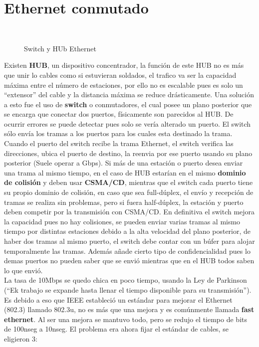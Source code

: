 \documentclass[
	12pt, %
	fleqn, %
	a4paper, %
	oneside, %
]{LegrandOrangeBook}
\begin{document}
\section{Ethernet conmutado}
\begin{figure}[]
\centering
{}\\
\caption{Switch y HUb Ethernet}
\end{figure}
Existen \textbf{HUB}, un dispositivo concentrador, la función de este HUB no es más que unir lo cables como si estuvieran soldados, el trafico va ser la capacidad máxima entre el número de estaciones, por ello no es escalable pues es solo un ``extensor'' del cable y la distancia máxima se reduce drásticamente. Una solución a esto fue el uso de \textbf{switch} o conmutadores, el cual posee un plano posterior que se encarga que conectar dos puertos, físicamente son parecidos al HUB. De ocurrir errores se puede detectar pues solo se vería alterado un puerto. El switch sólo envía los tramas a los puertos para los cuales esta destinado la trama. Cuando el puerto del switch recibe la trama Ethernet, el switch verifica las direcciones, ubica el puerto de destino, la reenvia por ese puerto usando su plano posterior (Suele operar a Gbps). Si más de una estación o puerto desea enviar una trama al mismo tiempo, en el caso de HUB estarían en el mismo \textbf{dominio de colisión} y deben usar \textbf{CSMA/CD}, mientras que el switch cada puerto tiene su propio dominio de colisión, en caso que sea full-dúplex, el envío y recepción de tramas se realiza sin problemas, pero si fuera half-dúplex, la estación y puerto deben competir por la transmisión con CSMA/CD. En definitiva el switch mejora la capacidad pues no hay colisiones, se pueden enviar varias tramas al mismo tiempo por distintas estaciones debido a la alta velocidad del plano posterior, de haber dos tramas al mismo puerto, el switch debe contar con un búfer para alojar temporalmente las tramas. Además añade cierto tipo de confidencialidad pues lo demas puertos no pueden saber que se envió mientras que en el HUB todos saben lo que envió.\\
La tasa de 10Mbps se quedo chica en poco tiempo, usando la Ley de Parkinson (``Ek trabajo se expande hasta llenar el tiempo disponible para su transmisión'').\\
Es debido a eso que IEEE estableció un estándar para mejorar el Ethernet (802.3) llamado 802.3u, no es más que una mejora y es comúnmente llamada \textbf{fast ethernet}. Al ser una mejora se mantuvo todo, pero se redujo el tiempo de bits de 100nseg a 10nseg. El problema era ahora fijar el estándar de cables, se eligieron 3:
\end{document}
